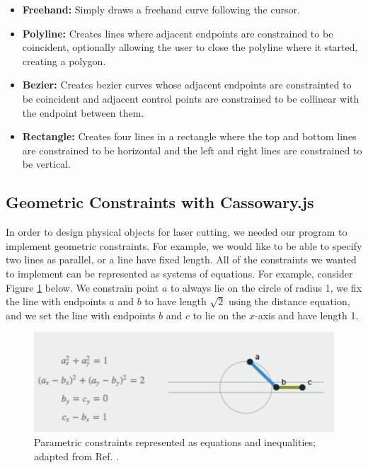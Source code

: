 \begin{itemize}
\item {\bf Freehand:} Simply draws a freehand curve following the cursor.
\item {\bf Polyline:} Creates lines where adjacent endpoints are constrained to be coincident, optionally allowing the user to close the polyline where it started, creating a polygon.
\item {\bf Bezier:} Creates bezier curves whose adjacent endpoints are constrainted to be coincident and adjacent control points are constrained to be collinear with the endpoint between them.
\item {\bf Rectangle:} Creates four lines in a rectangle where the top and bottom lines are constrained to be horizontal and the left and right lines are constrained to be vertical.
\end{itemize}

\subsection*{Geometric Constraints with Cassowary.js}

In order to design physical objects for laser cutting, we needed our program to implement geometric constraints. For example, we would like to be able to specify two lines as parallel, or a line have fixed length. All of the constraints we wanted to implement can be represented as systems of equations. For example, consider Figure \ref{fig:constraints} below. We constrain point $a$ to always lie on the circle of radius 1, we fix the line with endpoints $a$ and $b$ to have length $\sqrt{2}$ using the distance equation, and we set the line with endpoints $b$ and $c$ to lie on the $x$-axis and have length 1.

\begin{figure}[H]
  \includegraphics[width=\linewidth]{constraints.jpg}
  \caption{Parametric constraints represented as equations and inequalities; adapted from Ref. \cite{keeter}. }
  \label{fig:constraints}
\end{figure}

